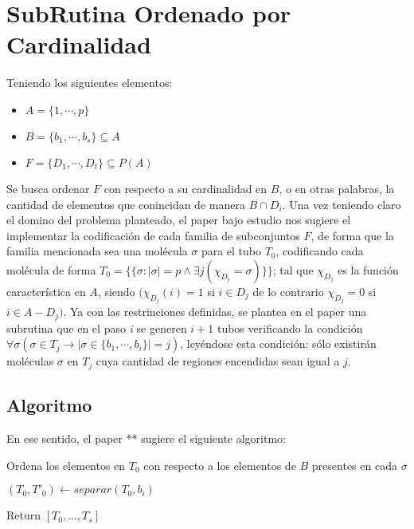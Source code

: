 \documentclass[12pt, letterpaper, twoside]{article}
\begin{document}
    \section{SubRutina Ordenado por Cardinalidad}
    Teniendo los siguientes elementos:
    \begin{itemize}
        \item $A = \{1,\cdots,p\}$
        \item $B = \{b_1,\cdots,b_s\} \subseteq A$ 
        \item $F = \{D_1,\cdots,D_t\} \subseteq P(A)$ 
    \end{itemize}
    Se busca ordenar $F$ con respecto a su cardinalidad en $B$, o en otras palabras, la cantidad de elementos que conincidan de manera $B\cap D_i$.
    Una vez teniendo claro el domino del problema planteado, el paper bajo estudio nos sugiere el implementar la codificación de cada familia de subconjuntos $F$, de forma que la familia mencionada sea una molécula $\sigma$ para el tubo $T_0$, codificando cada molécula de forma $T_0=\{\{\sigma:|\sigma|=p \land \exists j(\chi_{D_j}=\sigma)\}\}$; tal que $\chi_{D_j}$ es la función característica en $A$, siendo $(\chi_{D_j}(i) = 1$ si $i \in D_j$ de lo contrario $\chi_{D_j} = 0$ si $i \in A - D_j)$.
    Ya con las restrinciones definidas, se plantea en el paper una subrutina que en el paso \emph{i} se generen $i + 1$ tubos verificando la condición $\forall\sigma(\sigma\in T_j \rightarrow|\sigma\in\{b_1,\cdots,b_i\}|=j)$, leyéndose esta condición: sólo existirán moléculas $\sigma$ en $T_j$ cuya cantidad de regiones encendidas sean igual a $j$.
    \subsection{Algoritmo}
    En ese sentido, el paper ** sugiere el siguiente algoritmo:
    \begin{algorithm}
        \caption{Ordena los elementos en $T_0$ con respecto a los elementos de $B$ presentes en cada $\sigma$}
        \label{CardinalSort}
        \begin{algorithmic}[1]
            \State $(T_0, T'_0) \leftarrow separar(T_0, b_i)$
            
            \EndFor
            \EndFor
            \State Return $[T_0,...,T_s]$
            \EndProcedure
        \end{algorithmic}
    \end{algorithm}
    
\end{document}
